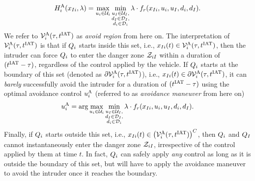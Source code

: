 \begin{equation}
H^{\text{A}}_{i}(x_{I i}, \lambda) = \max_{u_i \in \mathcal{U}_i} \min_{\substack{u_I \in \mathcal{U}_I, \\ d_I \in \mathcal{D}_I, \\ d_i \in \mathcal{D}_i}} \lambda \cdot f_r(x_{I i}, u_i, u_I, d_i, d_I).
\end{equation}
We refer to $\mathcal{V}^{\text{A}}_i(\tau, t^\text{IAT})$ as \textit{avoid region} from here on. The interpretation of $\mathcal{V}^{\text{A}}_{i}(\tau, t^\text{IAT})$ is that if $Q_i$ starts inside this set, i.e., $x_{I i}(t) \in  \mathcal{V}^{\text{A}}_{i}(\tau, t^\text{IAT})$, then the intruder can force $Q_i$ to enter the danger zone $\mathcal{Z}_{iI}$ within a duration of $(t^\text{IAT}-\tau)$, regardless of the control applied by the vehicle. If $Q_i$ starts at the boundary of this set (denoted as $\partial \mathcal{V}^{\text{A}}_{i}(\tau, t^\text{IAT})$), i.e., $x_{I i}(t) \in  \partial \mathcal{V}^{\text{A}}_{i}(\tau, t^\text{IAT})$, it can \textit{barely} successfully avoid the intruder for a duration of $(t^\text{IAT}-\tau)$ using the optimal avoidance control ${u^{\text{A}}_{i}}$ (referred to as \textit{avoidance maneuver} from here on)
\begin{equation} \label{eqn:optAvoidCtrl}
{\ctrl^{\text{A}}_{i}} = \arg \max_{\ctrl_i \in \cset_i} \min_{\substack{\ctrl_\intr \in \cset_\intr, \\ \dstb_\intr \in \dset_\intr, \\ \dstb_i \in \dset_i}} \costate \cdot f_r(\state_{\intr i}, \ctrl_i, \ctrl_\intr, \dstb_i, \dstb_\intr).
\end{equation}
\noindent Finally, if $Q_i$ starts outside this set, i.e., $x_{I i}(t) \in \left( \mathcal{V}^{\text{A}}_{i}(\tau, t^\text{IAT})\right)^C$, then  $Q_i$ and $Q_{I}$ cannot instantaneously enter the danger zone $\mathcal{Z}_{iI}$, irrespective of the control applied by them at time $t$. In fact, $Q_i$ can safely apply \textit{any} control as long as it is outside the boundary of this set, but will have to apply the avoidance maneuver to avoid the intruder once it reaches the boundary.

